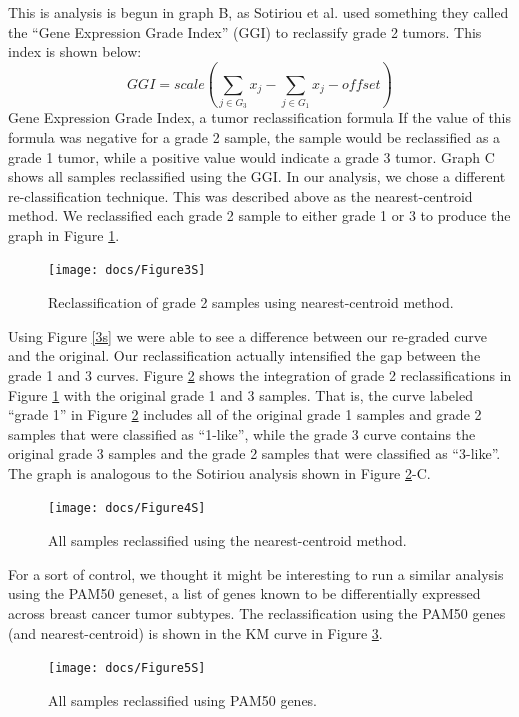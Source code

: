 \documentclass[a4paper,10pt]{article}
\begin{document}
This is analysis is begun in graph B, as Sotiriou et al. used something 
they called the “Gene Expression Grade Index” (GGI) to reclassify 
grade 2 tumors. This index is shown below:
$$
GGI = scale\left( \sum_{j\in G_3}{ x_j } - \sum_{j\in G_1}{ x_j } - offset  \right)
$$
Gene Expression Grade Index, a tumor reclassification formula
If the value of this formula was negative for a grade 2 sample, 
the sample would be reclassified as a grade 1 tumor, while a positive 
value would indicate a grade 3 tumor. Graph C shows all samples reclassified using the GGI.
In our analysis, we chose a different re-classification technique. 
This was described above as the nearest-centroid method. We reclassified 
each grade 2 sample to either grade 1 or 3 to produce the graph in Figure \ref{3S}.
\begin{figure}
\centering
\texttt{[image: docs/Figure3S]}
\caption{Reclassification of grade 2 samples using nearest-centroid method.}\label{3S}
\end{figure}
Using Figure \ref{3s} we were able to see a difference between our re-graded curve 
and the original. Our reclassification actually intensified the gap between the grade 1 and 3 curves.
Figure \ref{4S} shows the integration of grade 2 reclassifications in Figure  \ref{3S} with 
the original grade 1 and 3 samples. That is, the curve labeled “grade 1” in 
Figure  \ref{4S} includes all of the original grade 1 samples and grade 2 samples 
that were classified as “1-like”, while the grade 3 curve contains the original
 grade 3 samples and the grade 2 samples that were classified as “3-like”. 
The graph is analogous to the Sotiriou analysis shown in Figure \ref{4S}-C.
 \begin{figure}
\centering
\texttt{[image: docs/Figure4S]}
\caption{All samples reclassified using the nearest-centroid method.}\label{4S}
\end{figure}
For a sort of control, we thought it might be interesting to run a similar 
analysis using the PAM50 geneset, a list of genes known to be differentially
 expressed across breast cancer tumor subtypes. The reclassification using 
the PAM50 genes (and nearest-centroid) is shown in the KM curve in Figure \ref{5S}.
 \begin{figure}
\centering
\texttt{[image: docs/Figure5S]}
\caption{All samples reclassified using PAM50 genes.}\label{5S}
\end{figure}
\end{document}
